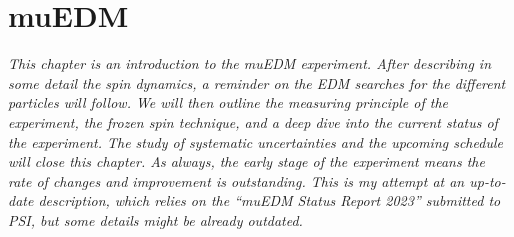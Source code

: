 \chapter{muEDM}
\label{ch:muEDM}
\begin{refsection}

{\itshape
This chapter is an introduction to the muEDM experiment. After describing in some detail the spin dynamics, a reminder on the EDM searches for the different particles will follow.
We will then outline the measuring principle of the experiment, the frozen spin technique, and a deep dive into the current status of the experiment. 
The study of systematic uncertainties and the upcoming schedule will close this chapter. 
As always, the early stage of the experiment means the rate of changes and improvement is outstanding. 
This is my attempt at an up-to-date description, which relies on the ``muEDM Status Report 2023'' submitted to PSI, but some details might be already outdated.}

\cite{muEDM:Semertzidis:2001} \cite{muEDM:Adelmann:2010} \cite{muEDM:J-PARC:2011} \cite{muEDM:J-PARC:2016} \cite{muEDM:PSI:2021} \cite{muEDM:PSI:Mikio:2022} \cite{muEDM:PSI:Kim:2022}


\end{refsection}
